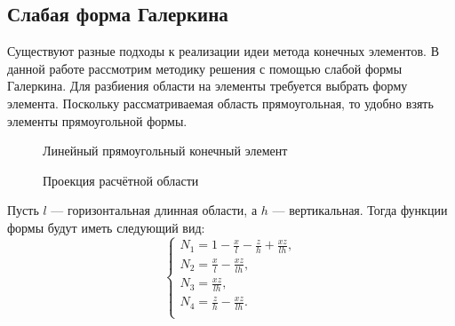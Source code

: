 \documentclass[a4paper,14pt]{extarticle}
\begin{document}
\subsection{Слабая форма Галеркина}

Существуют разные подходы к реализации идеи метода конечных элементов. В данной работе рассмотрим методику решения с помощью слабой формы Галеркина. Для разбиения области на элементы требуется выбрать форму элемента. Поскольку рассматриваемая область прямоугольная, то удобно взять элементы прямоугольной формы. 

\begin{figure}[!htbp]
	\caption{Линейный прямоугольный конечный элемент}
	\label{base_element}
\end{figure}
\begin{figure}[!htbp]
	\caption{Проекция расчётной области}
	\label{base_element_proection}
\end{figure}

Пусть $l$ --- горизонтальная длинная области, а $h$ --- вертикальная. Тогда функции формы будут иметь следующий вид:
\begin{equation}
	\begin{cases}
		N_1 = 1 - \frac{x}{l} - \frac{z}{h} + \frac{x  z}{l  h}, \\
		N_2 = \frac{x}{l} - \frac{x  z}{l  h}, \\
		N_3 = \frac{x  z}{l h}, \\
		N_4 = \frac{z}{h} - \frac{x  z}{l  h}. \\
	\end{cases}
\label{form-func}
\end{equation}
\end{document}
